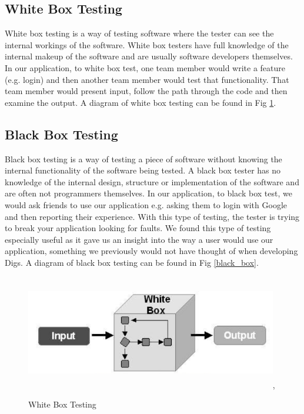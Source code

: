 \subsection{White Box Testing}
White box testing is a way of testing software where the tester can see the internal workings of the software. White box testers have full knowledge of the internal makeup of the software and are usually software developers themselves. In our application, to white box test, one team member would write a feature (e.g. login) and then another team member would test that functionality. That team member would present input, follow the path through the code and then examine the output. A diagram of white box testing can be found in Fig \ref{white_box}.

\subsection{Black Box Testing}
Black box testing is a way of testing a piece of software without knowing the internal functionality of the software being tested. A black box tester has no knowledge of the internal design, structure or implementation of the software and are often not programmers themselves. In our application, to black box test, we would ask friends to use our application e.g. asking them to login with Google and then reporting their experience. With this type of testing, the tester is trying to break your application looking for faults. We found this type of testing especially useful as it gave us an insight into the way a user would use our application, something we previously would not have thought of when developing Digs. A diagram of black box testing can be found in Fig \ref{black_box}.\\

\begin{figure}[h]
\centering
\includegraphics[width=11cm, height=5cm]{img/white_box.PNG},
\caption{White Box Testing}
\label{white_box}
\end{figure}


